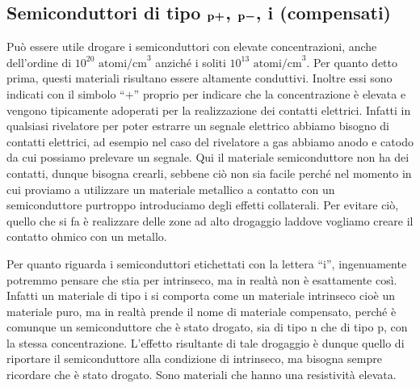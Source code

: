 \subsection[Semiconduttori di tipo \texorpdfstring{$\rm p+$}{p+}, \texorpdfstring{$\rm p-$}{p-}, i (compensati)]
{Semiconduttori di tipo $\boldsymbol{\rm p+}$, $\boldsymbol{\rm p-}$, i (compensati)}
Può essere utile drogare i semiconduttori con elevate concentrazioni, anche dell'ordine di $10^{20}\text{ atomi/cm}^3$ anziché i soliti $10^{13}\text{ atomi/cm}^3$. Per quanto detto prima, questi materiali risultano essere altamente conduttivi. Inoltre essi sono indicati con il simbolo ``$+$'' proprio per indicare che la concentrazione è elevata e vengono tipicamente adoperati per la realizzazione dei contatti elettrici. Infatti in qualsiasi rivelatore per poter estrarre un segnale elettrico abbiamo bisogno di contatti elettrici, ad esempio nel caso del rivelatore a gas abbiamo anodo e catodo da cui possiamo prelevare un segnale. Qui il materiale semiconduttore non ha dei contatti, dunque bisogna crearli, sebbene ciò non sia facile perché nel momento in cui proviamo a utilizzare un materiale metallico a contatto con un semiconduttore purtroppo introduciamo degli effetti collaterali. Per evitare ciò, quello che si fa è realizzare delle zone ad alto drogaggio laddove vogliamo creare il contatto ohmico con un metallo.

Per quanto riguarda i semiconduttori etichettati con la lettera ``i'', ingenuamente potremmo pensare che stia per intrinseco, ma in realtà non è esattamente così. Infatti un materiale di tipo i si comporta come un materiale intrinseco cioè un materiale puro, ma in realtà prende il nome di materiale compensato, perché è comunque un semiconduttore che è stato drogato, sia di tipo n che di tipo p, con la stessa concentrazione. L'effetto risultante di tale drogaggio è dunque quello di riportare il semiconduttore alla condizione di intrinseco, ma bisogna sempre ricordare che è stato drogato. Sono materiali che hanno una resistività elevata.

